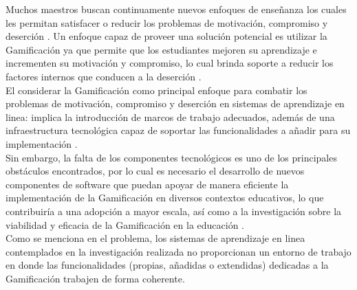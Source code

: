     \noindent Muchos maestros buscan continuamente nuevos enfoques de enseñanza los cuales les permitan satisfacer o reducir los problemas de motivación, compromiso y deserción \cite{objetivo1}. 
    Un enfoque capaz de proveer una solución potencial es utilizar la Gamificación ya que permite que los estudiantes mejoren su aprendizaje e incrementen su motivación y compromiso, lo cual brinda soporte a reducir los factores internos que conducen a la deserción \cite{dropoutOnline}.\\
    
    \noindent El considerar la Gamificación como principal enfoque para combatir los problemas de motivación, compromiso y deserción en sistemas de aprendizaje en linea: implica la introducción de marcos de trabajo adecuados, además de una infraestructura tecnológica capaz de soportar las funcionalidades a añadir para su implementación \cite{mappingStudy}.\\
    
    \noindent Sin embargo, la falta de los componentes tecnológicos es uno de los principales obstáculos encontrados, por lo cual es necesario el desarrollo de nuevos componentes de software que puedan apoyar de manera eficiente la implementación de la Gamificación en diversos contextos educativos, lo que contribuiría a una adopción a mayor escala, así como a la investigación sobre la viabilidad y eficacia de la Gamificación en la educación \cite{mappingStudy}.\\
    
    



    \noindent Como se menciona en el problema, los sistemas de aprendizaje en linea contemplados en la investigación realizada no proporcionan un entorno de trabajo en donde las funcionalidades (propias, añadidas o extendidas) dedicadas a la Gamificación trabajen de forma coherente.\\
    
